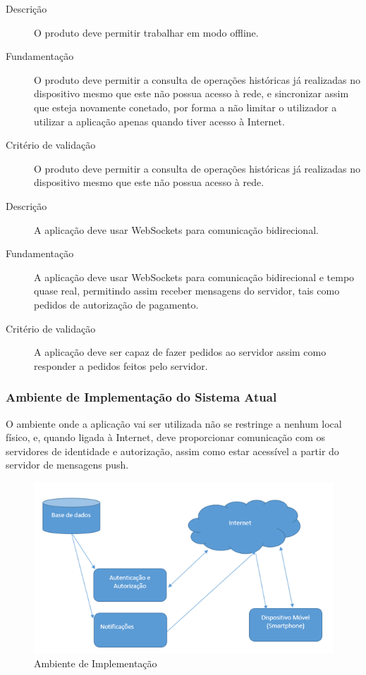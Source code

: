 \documentclass{article}
\begin{document}
      \begin{description}
        \item[Descrição]O produto deve permitir trabalhar em modo offline.
        \item[Fundamentação]O produto deve permitir a consulta de operações históricas já realizadas no dispositivo mesmo que este não possua acesso à rede, e sincronizar assim que esteja novamente conetado, por forma a não limitar o utilizador a utilizar a aplicação apenas quando tiver acesso à Internet.
        \item[Critério de validação]O produto deve permitir a consulta de operações históricas já realizadas no dispositivo mesmo que este não possua acesso à rede.
      \end{description}

\vspace{0.7cm}
      \begin{description}
        \item[Descrição]A aplicação deve usar WebSockets para comunicação bidirecional.
        \item[Fundamentação]A aplicação deve usar WebSockets para comunicação bidirecional e tempo quase real, permitindo assim receber mensagens do servidor, tais como pedidos de autorização de pagamento.
        \item[Critério de validação]A aplicação deve ser capaz de fazer pedidos ao servidor assim como responder a pedidos feitos pelo servidor.
      \end{description}


    \subsubsection{Ambiente de Implementação do Sistema Atual}

      O ambiente onde a aplicação vai ser utilizada não se restringe a nenhum local físico, e, quando ligada à Internet, deve proporcionar comunicação com os servidores de identidade e autorização, assim como estar acessível a partir do servidor de mensagens push.

      \begin{figure}[ht!]
        \centering
          \includegraphics[width=0.7\linewidth]{img/img2}
          \caption{Ambiente de Implementação}
          \label{img2}
      \end{figure}
\end{document}
